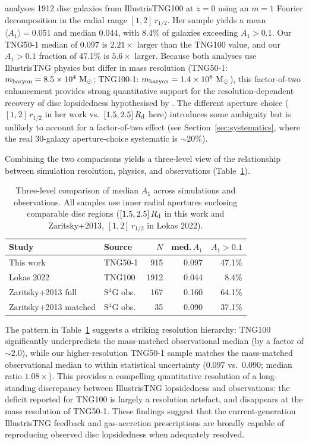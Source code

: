 \documentclass[fleqn,usenatbib]{mnras}
\newcommand{\Am}[1]{A_{#1}}
\newcommand{\Msun}{\mathrm{M}_{\odot}}
\newcommand{\Rd}{R_{\rm d}}
\newcommand{\Amone}{\ensuremath{\Am{1}}}
\begin{document}
\citet{2022A&A...662A..53L} analyses 1912 disc galaxies from IllustrisTNG100
at $z=0$ using an $m=1$ Fourier decomposition in the radial range
$[1, 2]\,r_{1/2}$.  Her sample yields a mean
$\langle \Amone \rangle = 0.051$ and median 0.044, with 8.4\%
of galaxies exceeding $\Amone > 0.1$.  Our TNG50-1 median of 0.097
is $2.21\times$ larger than the TNG100 value, and our
$\Amone > 0.1$ fraction of 47.1\% is $5.6\times$ larger.  Because
both analyses use IllustrisTNG physics but differ in mass
resolution (TNG50-1: $m_{\rm baryon} = 8.5 \times 10^4~\Msun$;
TNG100-1: $m_{\rm baryon} = 1.4 \times 10^6~\Msun$), this
factor-of-two enhancement provides strong quantitative support
for the resolution-dependent recovery of disc lopsidedness
hypothesised by \citet{2022A&A...662A..53L}.  The different aperture choice
($[1, 2]\,r_{1/2}$ in her work vs.\ $[1.5, 2.5]\,\Rd$ here)
introduces some ambiguity but is unlikely to account for a
factor-of-two effect (see Section~\ref{sec:systematics}, where the real
30-galaxy aperture-choice systematic is $\sim 20\%$).

Combining the two comparisons yields a three-level view of the
relationship between simulation resolution, physics, and
observations (Table~\ref{tab:three_level}).

\begin{table}
  \centering
  \caption{Three-level comparison of median $\Amone$ across
    simulations and observations.  All samples use inner radial
    apertures enclosing comparable disc regions
    ($[1.5, 2.5]\,\Rd$ in this work and Zaritsky+2013,
    $[1, 2]\,r_{1/2}$ in Lokas 2022).}
  \label{tab:three_level}
  \begin{tabular}{llrrr}
    \toprule
    Study & Source        & $N$   & med.\,$\Amone$ & $\Amone > 0.1$ \\
    \midrule
    This work                & TNG50-1        & 915  & 0.097 & 47.1\% \\
    Lokas 2022               & TNG100         & 1912 & 0.044 &  8.4\% \\
    Zaritsky+2013 full       & S$^{4}$G obs.  & 167  & 0.160 & 64.1\% \\
    Zaritsky+2013 matched    & S$^{4}$G obs.  &  35  & 0.090 & 37.1\% \\
    \bottomrule
  \end{tabular}
\end{table}

The pattern in Table~\ref{tab:three_level} suggests a striking
resolution hierarchy: TNG100 significantly underpredicts the
mass-matched observational median (by a factor of $\sim 2.0$),
while our higher-resolution TNG50-1 sample matches the
mass-matched observational median to within statistical
uncertainty ($0.097$ vs.\ $0.090$; median ratio $1.08\times$).  This
provides a compelling quantitative resolution of a long-standing
discrepancy between IllustrisTNG lopsidedness and observations:
the deficit reported for TNG100 is largely a resolution artefact,
and disappears at the mass resolution of TNG50-1.  These findings
suggest that the current-generation IllustrisTNG feedback and
gas-accretion prescriptions are broadly capable of reproducing
observed disc lopsidedness \citep{2005A&A...438..507B,2009PhR...471...75J}
when adequately resolved.
\end{document}
